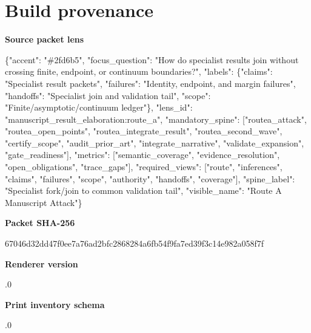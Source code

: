 \documentclass[10pt,a4paper]{article}
\newcommand{\TraceField}[2]{\par\noindent\textbf{#1}\par\noindent #2\par\smallskip}
\begin{document}
\section{Build provenance}\label{app-provenance}
\TraceField{Source packet lens}{\{"accent":\allowbreak{} "\#2fd6b5",\allowbreak{} "focus\_\allowbreak{}question":\allowbreak{} "How do specialist\allowbreak{} results join without crossing finite, endpoint, or continuum boundaries\allowbreak{}?", "labels":\allowbreak{} \{"claims":\allowbreak{} "Specialis\allowbreak{}t result packets", "failures"\allowbreak{}:\allowbreak{} "Identity,\allowbreak{} endpoint, and margin failures",\allowbreak{} "handoffs"\allowbreak{}:\allowbreak{} "Specialis\allowbreak{}t join and validation\allowbreak{} tail", "scope":\allowbreak{} "Finite/\allowbreak{}asymptotic\allowbreak{}/\allowbreak{}continuum ledger"\}, "lens\_\allowbreak{}id":\allowbreak{} "manuscrip\allowbreak{}t\_\allowbreak{}result\_\allowbreak{}elaboratio\allowbreak{}n:\allowbreak{}route\_\allowbreak{}a", "mandatory\allowbreak{}\_\allowbreak{}spine":\allowbreak{} ["routea\_\allowbreak{}attack", "routea\_\allowbreak{}open\_\allowbreak{}points", "routea\_\allowbreak{}integrate\_\allowbreak{}result", "routea\_\allowbreak{}second\_\allowbreak{}wave", "certify\_\allowbreak{}scope", "audit\_\allowbreak{}prior\_\allowbreak{}art", "integrate\allowbreak{}\_\allowbreak{}narrative"\allowbreak{}, "validate\_\allowbreak{}expansion"\allowbreak{}, "gate\_\allowbreak{}readiness"\allowbreak{}], "metrics":\allowbreak{} ["semantic\allowbreak{}\_\allowbreak{}coverage",\allowbreak{} "evidence\_\allowbreak{}resolution\allowbreak{}", "open\_\allowbreak{}obligation\allowbreak{}s", "trace\_\allowbreak{}gaps"], "required\_\allowbreak{}views":\allowbreak{} ["route", "inference\allowbreak{}s", "claims", "failures"\allowbreak{}, "scope", "authority\allowbreak{}", "handoffs"\allowbreak{}, "coverage"\allowbreak{}], "spine\_\allowbreak{}label":\allowbreak{} "Specialis\allowbreak{}t fork/\allowbreak{}join to common validation\allowbreak{} tail", "visible\_\allowbreak{}name":\allowbreak{} "Route A Manuscript\allowbreak{} Attack"\}}
\TraceField{Packet SHA-256}{67046d32dd\allowbreak{}47f0ee7a76\allowbreak{}ad2bfc2868\allowbreak{}284a6fb54f\allowbreak{}9fa7ed39f3\allowbreak{}c14e982a05\allowbreak{}8f7f}
\TraceField{Renderer version}{1.\allowbreak{}0}
\TraceField{Print inventory schema}{1.\allowbreak{}0}
\end{document}
